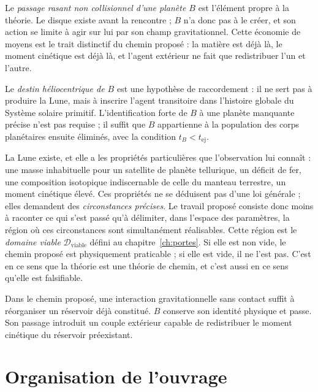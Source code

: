 \documentclass[11pt,a4paper,openany]{report}
\begin{document}
Le \emph{passage rasant non collisionnel d'une planète $B$} est l'élément propre à la théorie. Le
disque existe avant la rencontre ; $B$ n'a donc pas à le créer, et son action se limite à agir sur
lui par son champ gravitationnel. Cette économie de moyens est le trait distinctif du chemin
proposé : la matière est déjà là, le moment cinétique est déjà là, et l'agent extérieur ne fait
que redistribuer l'un et l'autre.

Le \emph{destin héliocentrique de $B$} est une hypothèse de raccordement : il ne sert pas à produire
la Lune, mais à inscrire l'agent transitoire dans l'histoire globale du Système solaire primitif.
L'identification forte de $B$ à une planète manquante précise n'est pas requise ; il suffit que $B$
appartienne à la population des corps planétaires ensuite éliminés, avec la condition
$ t_B<t_{\mathrm{ej}} $.

\begin{ideephys}
La Lune existe, et elle a les propriétés particulières que l'observation lui connaît : une masse
inhabituelle pour un satellite de planète tellurique, un déficit de fer, une composition isotopique
indiscernable de celle du manteau terrestre, un moment cinétique élevé. Ces propriétés ne se
déduisent pas d'une loi générale ; elles demandent des \emph{circonstances précises}. Le travail
proposé consiste donc moins à raconter ce qui s'est passé qu'à délimiter, dans l'espace des
paramètres, la région où ces circonstances sont simultanément réalisables. Cette région est le
\emph{domaine viable} $\mathcal{D}_{\mathrm{viable}}$ défini au chapitre~\ref{ch:portes}. Si elle
est non vide, le chemin proposé est physiquement praticable ; si elle est vide, il ne l'est pas.
C'est en ce sens que la théorie est une théorie de chemin, et c'est aussi en ce sens qu'elle est
falsifiable.
\end{ideephys}

\begin{lecture}
Dans le chemin proposé, une interaction gravitationnelle sans contact suffit à réorganiser un
réservoir déjà constitué. $B$ conserve son identité physique et passe. Son passage introduit un
couple extérieur capable de redistribuer le moment cinétique du réservoir préexistant.
\end{lecture}


\section{Organisation de l'ouvrage}
\end{document}
